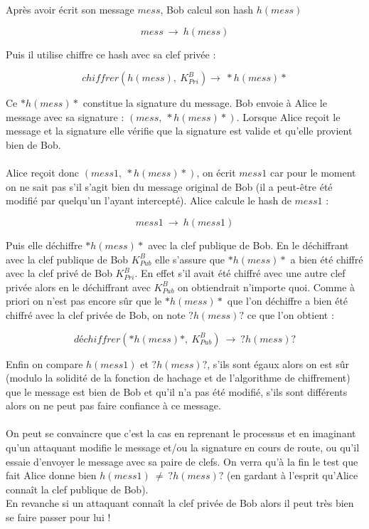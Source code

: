 \documentclass[11pt,a4paper]{article}
\begin{document}
Après avoir écrit son message $mess$, Bob calcul son hash $h(mess)$

$$ mess ~ \rightarrow ~ h(mess) $$

Puis il utilise chiffre ce hash avec sa clef privée :

$$ chiffrer(h(mess),~ K_{Pri}^{B}) \rightarrow ~ *h(mess)* $$

Ce $*h(mess)*$ constitue la signature du message. Bob envoie à Alice le message avec sa signature : $ (mess, ~*h(mess)*)$. Lorsque Alice reçoit le message et la signature elle vérifie que la signature est valide et qu'elle provient bien de Bob.\\\\

Alice reçoit donc $(mess1,  ~*h(mess)*)$, on écrit $mess1$ car pour le moment on ne sait pas s'il s'agit bien du message original de Bob (il a peut-être été modifié par quelqu'un l'ayant intercepté). Alice calcule le hash de $mess1$ :

$$ mess1 ~ \rightarrow ~ h(mess1) $$

Puis elle déchiffre $*h(mess)*$ avec la clef publique de Bob. En le déchiffrant avec la clef publique de Bob $K_{Pub}^{B} $ elle s'assure que $*h(mess)*$ a bien été chiffré avec la clef privé de Bob $K_{Pri}^{B} $. En effet s'il avait été chiffré avec une autre clef privée alors en le déchiffrant avec $K_{Pub}^{B}$ on obtiendrait n'importe quoi. Comme à priori on n'est pas encore sûr que le $*h(mess)*$ que l'on déchiffre a bien été chiffré avec la clef privée de Bob, on note $?h(mess)?$ ce que l'on obtient :

$$ déchiffrer(*h(mess)*,~ K_{Pub}^{B})~ \rightarrow ~?h(mess)? $$

Enfin on compare $h(mess1)$ et $?h(mess)?$, s'ils sont égaux alors on est sûr (modulo la solidité de la fonction de hachage et de l'algorithme de chiffrement) que le message est bien de Bob et qu'il n'a pas été modifié, s'ils sont différents alors on ne peut pas faire confiance à ce message.\\\\
On peut se convaincre que c'est la cas en reprenant le processus et en imaginant qu'un attaquant modifie le message et/ou la signature en cours de route, ou qu'il essaie d'envoyer le message avec sa paire de clefs. On verra qu'à la fin le test que fait Alice donne bien $h(mess1) ~\neq~ ?h(mess)?$ (en gardant à l'esprit qu'Alice connaît la clef publique de Bob).\\
En revanche si un attaquant connaît la clef privée de Bob alors il peut très bien se faire passer pour lui !
\end{document}
